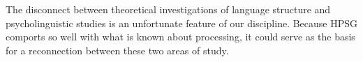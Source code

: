 \documentclass[a4paper]{article}
\begin{document}
The disconnect between theoretical investigations of language structure and psycholinguistic studies is an unfortunate feature of our discipline.  Because HPSG comports so well with what is known about processing, it could serve as the basis for a reconnection between these two areas of study.
%
%
%
%







\end{document}

